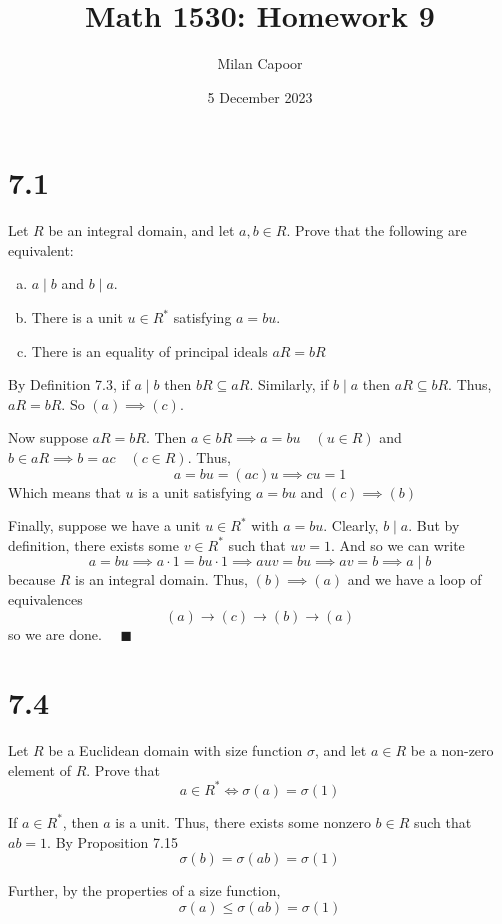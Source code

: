 \documentclass[12pt]{article}
\title{Math 1530: Homework 9}
\author{Milan Capoor}
\date{5 December 2023}
\newcommand{\qed}{\quad \blacksquare}
\begin{document}
\maketitle
\section*{7.1}
Let $R$ be an integral domain, and let $a, b \in R$. Prove that the following are equivalent:
\begin{enumerate}[(a)]
    \item $a \mid b$ and $b \mid a$.
    \item There is a unit $u \in R^*$ satisfying $a = bu$.
    \item There is an equality of principal ideals $aR = bR$
\end{enumerate}

    \color{blue}
        By Definition 7.3, if $a \mid b$ then $bR \subseteq aR$. Similarly, if $b \mid a$ then $aR \subseteq bR$. Thus, $aR = bR$. So $(a) \implies (c)$. 

        Now suppose $aR = bR$. Then $a \in bR \implies a = bu \quad (u \in R)$ and $b \in aR \implies b = ac \quad (c \in R)$. Thus, 
        \[a = bu = (ac)u \implies cu = 1\]
        Which means that $u$ is a unit satisfying $a = bu$ and $(c) \implies (b)$ 
        
        Finally, suppose we have a unit $u \in R^*$ with $a = bu$. Clearly, $b \mid a$. But by definition, there exists some $v \in R^*$ such that $uv = 1$. And so we can write 
        \[a = bu \implies a\cdot 1 = bu \cdot 1 \implies auv = bu \implies av = b \implies a \mid b\]
        because $R$ is an integral domain. Thus, $(b) \implies (a)$ and we have a loop of equivalences 
        \[(a) \to (c) \to (b) \to (a)\]
        so we are done. $\qed$
    \color{black}

\pagebreak

\section*{7.4}
Let $R$ be a Euclidean domain with size function $\sigma$, and let $a \in R$ be a non-zero element of $R$. Prove that
\[a\in R^* \iff \sigma(a) = \sigma(1)\]

    \color{blue}
        If $a \in R^*$, then $a$ is a unit. Thus, there exists some nonzero $b \in R$ such that $ab = 1$. By Proposition 7.15
        \[\sigma(b) = \sigma(ab) = \sigma(1)\]
        
        Further, by the properties of a size function, 
        \[\sigma(a) \leq \sigma(ab) = \sigma(1)\] 
\end{document}
